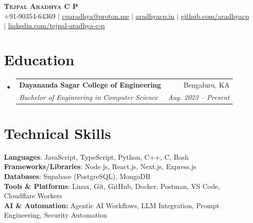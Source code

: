 \documentclass[letterpaper,11pt]{article}
\makeatletter
\newcommand{\resumeSubheading}[4]{
  \vspace{-2pt}\item
    \begin{tabular*}{0.97\textwidth}[t]{l@{\extracolsep{\fill}}r}
      \textbf{#1} & #2 \\
      \textit{\small#3} & \textit{\small #4} \\
    \end{tabular*}\vspace{-7pt}
}
\newcommand{\resumeSubHeadingListStart}{\begin{itemize}[leftmargin=0.15in, label={}]}
\newcommand{\resumeSubHeadingListEnd}{\end{itemize}}
\makeatother
\begin{document}

\begin{center}
    \textbf{\Huge \scshape Tejpal Aradhya C P} \\ \vspace{1pt}
    \small +91-90354-64369 $|$ 
    \href{mailto:cparadhya@proton.me}{\underline{cparadhya@proton.me}} $|$ 
    \href{https://aradhyacp.in}{\underline{aradhyacp.in}} $|$
    \href{https://github.com/aradhyacp}{\underline{github.com/aradhyacp}} $|$
    \href{https://in.linkedin.com/in/tejpal-aradhya-c-p}{\underline{linkedin.com/tejpal-aradhya-c-p}}
\end{center}


\section{Education}
  \resumeSubHeadingListStart
    \resumeSubheading
      {Dayananda Sagar College of Engineering}{Bengaluru, KA}
      {Bachelor of Engineering in Computer Science}{Aug. 2023 -- Present}
  \resumeSubHeadingListEnd

\section{Technical Skills}
\begin{itemize}[leftmargin=0.15in, label={}, topsep=0pt, itemsep=0pt]
\small{\item{
\textbf{Languages}{: JavaScript, TypeScript, Python, C++, C, Bash} \\
\textbf{Frameworks/Libraries}{: Node js, React.js, Next.js, Express.js} \\
\textbf{Databases}{: Supabase (PostgreSQL), MongoDB} \\
\textbf{Tools \& Platforms}{: Linux, Git, GitHub, Docker, Postman, VS Code, Cloudflare Workers} \\
\textbf{AI \& Automation:} {Agentic AI Workflows, LLM Integration, Prompt Engineering, Security Automation}
}}
\end{itemize}
\end{document}
